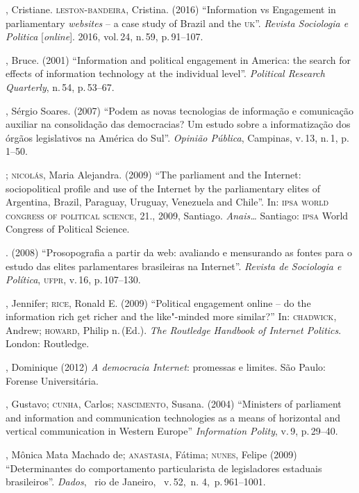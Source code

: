 \begin{bibliohedra}
, Cristiane. \textsc{leston}-\textsc{bandeira}, Cristina. (2016) ``Information vs
Engagement in parliamentary \textit{websites} -- a case study of Brazil and the
\textsc{uk}''. \textit{Revista Sociologia e Politica} {[}\textit{online}{]}. 2016, vol.\,24,
n.\,59, p.\,91--107.

, Bruce. (2001) ``Information and political engagement in America:
the search for effects of information technology at the individual
level''. \textit{Political Research Quarterly}, n.\,54, p.\,53--67.

, Sérgio Soares. (2007) ``Podem as novas tecnologias de informação
e comunicação auxiliar na consolidação das democracias? Um estudo sobre
a informatização dos órgãos legislativos na América do Sul''.
\textit{Opinião Pública}, Campinas, v.\,13, n.\,1, p.\,1--50.

\titidem; \textsc{nicolás}, Maria Alejandra. (2009) ``The parliament and the
Internet: sociopolitical profile and use of the Internet by the
parliamentary elites of Argentina, Brazil, Paraguay, Uruguay, Venezuela
and Chile''. In: \textsc{ipsa world congress of political science}, 21., 2009,
Santiago. \textit{Anais\ldots{}} Santiago: \textsc{ipsa} World Congress of Political
Science.

\titidem. (2008) ``Prosopografia a partir
da web: avaliando e mensurando as fontes para o estudo das elites
parlamentares brasileiras na Internet''. \textit{Revista de Sociologia e
Política}, \textsc{ufpr}, v.\,16, p.\,107--130.

, Jennifer; \textsc{rice}, Ronald E. (2009) ``Political engagement
online -- do the information rich get richer and the like"-minded more
similar?'' In: \textsc{chadwick}, Andrew; \textsc{howard}, Philip n.\,(Ed.). \textit{The
Routledge Handbook of Internet Politics}. London: Routledge.

, Dominique (2012) \textit{A democracia Internet}: promessas e
limites. São Paulo: Forense Universitária.

, Gustavo; \textsc{cunha}, Carlos; \textsc{nascimento}, Susana. (2004) ``Ministers
of parliament and information and communication technologies as a means
of horizontal and vertical communication in Western Europe''
\textit{Information Polity}, v.\,9, p.\,29--40.

, Mônica Mata Machado de; \textsc{anastasia}, Fátima; \textsc{nunes}, Felipe (2009)
``Determinantes do comportamento particularista de legisladores
estaduais brasileiros''. \textit{Dados},~ rio de Janeiro,~ v.\,52,~n. 4,~p.\,961--1001.


\end{bibliohedra}
